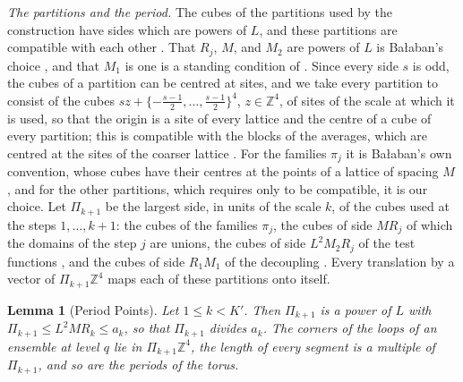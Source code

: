 \documentclass[11pt]{preprint}
\numberwithin{equation}{section}
\newtheorem{lemma}[theorem]{Lemma}
\theoremstyle{definition}
\theoremstyle{remark}
\theoremstyle{plain}
\begin{document}
\emph{The partitions and the period.} The cubes of the partitions used by the construction have sides which are powers of $L$, and these partitions are compatible with each other \cite[p.~245]{BalabanCRE}. That $R_j$, $M$, and $M_2$ are powers of $L$ is Ba{\l}aban's choice \cite[p.~245]{BalabanCRE}, and that $M_1$ is one is a standing condition of \cite[(3.1)]{WilsonFirstStep}. Since every side $s$ is odd, the cubes of a partition can be centred at sites, and we take every partition to consist of the cubes $sz + \{-\frac{s-1}{2}, \dots, \frac{s-1}{2}\}^4$, $z \in \mathbb Z^4$, of sites of the scale at which it is used, so that the origin is a site of every lattice and the centre of a cube of every partition; this is compatible with the blocks of the averages, which are centred at the sites of the coarser lattice \cite[(0.3), p.~252]{BalabanRG1}. For the families $\pi_j$ it is Ba{\l}aban's own convention, whose cubes have their centres at the points of a lattice of spacing $M$ \cite[p.~257]{BalabanRG1}, and for the other partitions, which \cite[p.~245]{BalabanCRE} requires only to be compatible, it is our choice. Let $\Pi_{k+1}$ be the largest side, in units of the scale $k$, of the cubes used at the steps $1, \dots, k + 1$: the cubes of the families $\pi_j$, the cubes of side $MR_j$ of which the domains of the step $j$ are unions, the cubes of side $L^2M_2R_j$ of the test functions \cite[(3.2), (3.3), (3.16)]{BalabanCRE}, and the cubes of side $R_1M_1$ of the decoupling \cite[p.~3]{BalabanRG2}. Every translation by a vector of $\Pi_{k+1}\mathbb Z^4$ maps each of these partitions onto itself.

\begin{lemma}[Period Points]\label{lem:period-points}
Let $1 \leq k < K'$. Then $\Pi_{k+1}$ is a power of $L$ with $\Pi_{k+1} \leq L^2MR_k \leq a_k$, so that $\Pi_{k+1}$ divides $a_k$. The corners of the loops of an ensemble at level $q$ lie in $\Pi_{k+1}\mathbb Z^4$, the length of every segment is a multiple of $\Pi_{k+1}$, and so are the periods of the torus.
\end{lemma}
\end{document}
